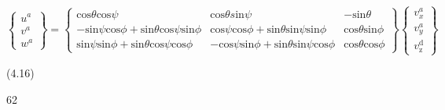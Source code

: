 $\left\{\begin{array}{l}
u^{a}\\
v^{a}\\
w^{a}
\end{array}\right\}=\left\{\begin{array}{lll}
\mathrm{c}\mathrm{o}\mathrm{s}\theta \mathrm{c}\mathrm{o}\mathrm{s}\psi & \mathrm{c}\mathrm{o}\mathrm{s}\theta s\mathrm{i}\mathrm{n}\psi & -\mathrm{s}\mathrm{i}\mathrm{n}\theta\\
-\mathrm{s}\mathrm{i}\mathrm{n}\psi \mathrm{c}\mathrm{o}\mathrm{s}\phi+\mathrm{s}\mathrm{i}\mathrm{n}\theta \mathrm{c}\mathrm{o}\mathrm{s}\psi \mathrm{s}\mathrm{i}\mathrm{n}\phi & \mathrm{c}\mathrm{o}\mathrm{s}\psi \mathrm{c}\mathrm{o}\mathrm{s}\phi+\mathrm{s}\mathrm{i}\mathrm{n}\theta \mathrm{s}\mathrm{i}\mathrm{n}\psi \mathrm{s}\mathrm{i}\mathrm{n}\phi & \mathrm{c}\mathrm{o}\mathrm{s}\theta \mathrm{s}\mathrm{i}\mathrm{n}\phi\\
\mathrm{s}\mathrm{i}\mathrm{n}\psi \mathrm{s}\mathrm{i}\mathrm{n}\phi+\mathrm{s}\mathrm{i}\mathrm{n}\theta \mathrm{c}\mathrm{o}\mathrm{s}\psi \mathrm{c}\mathrm{o}\mathrm{s}\phi & -\mathrm{c}\mathrm{o}\mathrm{s}\psi \mathrm{s}\mathrm{i}\mathrm{n}\phi+\mathrm{s}\mathrm{i}\mathrm{n}\theta \mathrm{s}\mathrm{i}\mathrm{n}\psi \mathrm{c}\mathrm{o}\mathrm{s}\phi & \mathrm{c}\mathrm{o}\mathrm{s}\theta \mathrm{c}\mathrm{o}\mathrm{s}\phi
\end{array}\right\}\left\{\begin{array}{l}
v_{x}^{a}\\
v_{y}^{a}\\
v_{\mathrm{z}}^{\mathrm{d}}
\end{array}\right\}$
\begin{flushright}
(4.16)
\end{flushright}\begin{center}
62
\end{center}


